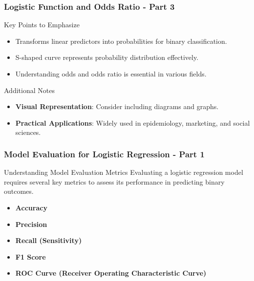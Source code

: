 \documentclass[aspectratio=169]{beamer}
\begin{document}
\begin{frame}[fragile]
    \frametitle{Logistic Function and Odds Ratio - Part 3}
    
    \begin{block}{Key Points to Emphasize}
        \begin{itemize}
            \item Transforms linear predictors into probabilities for binary classification.
            \item S-shaped curve represents probability distribution effectively.
            \item Understanding odds and odds ratio is essential in various fields.
        \end{itemize}
    \end{block}
    
    \begin{block}{Additional Notes}
        \begin{itemize}
            \item \textbf{Visual Representation}: Consider including diagrams and graphs.
            \item \textbf{Practical Applications}: Widely used in epidemiology, marketing, and social sciences.
        \end{itemize}
    \end{block}
\end{frame}

\begin{frame}[fragile]
    \frametitle{Model Evaluation for Logistic Regression - Part 1}
    \begin{block}{Understanding Model Evaluation Metrics}
        Evaluating a logistic regression model requires several key metrics to assess its performance in predicting binary outcomes.
    \end{block}

    \begin{itemize}
        \item \textbf{Accuracy}
        \item \textbf{Precision}
        \item \textbf{Recall (Sensitivity)}
        \item \textbf{F1 Score}
        \item \textbf{ROC Curve (Receiver Operating Characteristic Curve)}
    \end{itemize}
\end{frame}
\end{document}
